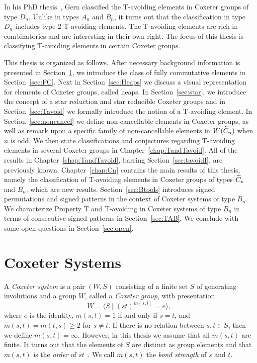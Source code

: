 In his PhD thesis~\cite{Gern2013a}, Gern classified the T-avoiding elements in Coxeter groups of type $D_n$. Unlike in types $A_n$ and $B_n$, it turns out that the classification in type $D_n$ includes type 2 T-avoiding elements. The T-avoiding elements are rich in combinatorics and are interesting in their own right. The focus of this thesis is classifying T-avoiding elements in certain Coxeter groups.

This thesis is organized as follows. After necessary background information is presented in Section~\ref{sec:coxeter}, we introduce the class of fully commutative elements in Section~\ref{sec:FC}. Next in Section~\ref{sec:Heaps} we discuss a visual representation for elements of Coxeter groups, called heaps. In Section~\ref{sec:star}, we introduce the concept of a star reduction and star reducible Coxeter groups and in Section~\ref{sec:Tavoid} we formally introduce the notion of a T-avoiding element. In Section~\ref{sec:noncancel} we define non-cancellable elements in Coxeter groups, as well as remark upon a specific family of non-cancellable elements in $W(\widetilde{C}_n)$ when $n$ is odd. We then state classifications and conjectures regarding T-avoiding elements in several Coxeter groups in Chapter~\ref{chap:TandTavoid}. All of the results in Chapter~\ref{chap:TandTavoid}, barring Section~\ref{sec:tavoidI}, are previously known. Chapter~\ref{chap:Cn} contains the main results of this thesis, namely the classification of T-avoiding elements in Coxeter groups of types $\widetilde{C}_n$ and $B_n$, which are new results. Section~\ref{sec:Btools} introduces signed permutations and signed patterns in the context of Coxeter systems of type $B_n$. We characterize Property T and T-avoiding in Coxeter systems of type $B_n$ in terms of consecutive signed patterns in Section~\ref{sec:TAB}. We conclude with some open questions in Section~\ref{sec:open}.



\section{Coxeter Systems}\label{sec:coxeter}

A \emph{Coxeter system} is a pair $(W,S)$ consisting of a finite set $S$ of generating involutions and a group $W$, called a \emph{Coxeter group}, with presentation 
\[ 
W = \langle S \mid (st)^{m(s, t)} = e  \rangle,
\]
where $e$ is the identity, $m(s,t) = 1$ if and only if $s = t$, and $m(s,t) = m(t,s) \geq 2$ for $s \neq t$. If there is no relation between $s,t \in S$, then we define $m(s,t)=\infty$. However, in this thesis we assume that all $m(s,t)$ are finite. It turns out that the elements of $S$ are distinct as group elements and that $m(s,t)$ is the \emph\emph{order} of $st$~\cite{Humphreys1990}. We call $m(s,t)$ the \emph{bond strength} of $s$ and $t$.\\

